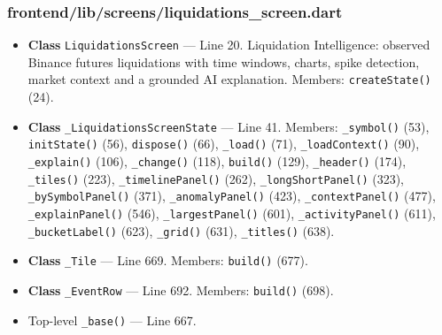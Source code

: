 \subsubsection*{frontend/lib/screens/liquidations\_screen.dart}
\begin{itemize}[nosep,leftmargin=1.5em]
\item \textbf{Class} \texttt{LiquidationsScreen} --- Line 20. Liquidation Intelligence: observed Binance futures liquidations with time windows, charts, spike detection, market context and a grounded AI explanation. Members: \texttt{createState(\allowbreak{})} (24).
\item \textbf{Class} \texttt{\_\allowbreak{}LiquidationsScreenState} --- Line 41. Members: \texttt{\_\allowbreak{}symbol(\allowbreak{})} (53), \texttt{initState(\allowbreak{})} (56), \texttt{dispose(\allowbreak{})} (66), \texttt{\_\allowbreak{}load(\allowbreak{})} (71), \texttt{\_\allowbreak{}loadContext(\allowbreak{})} (90), \texttt{\_\allowbreak{}explain(\allowbreak{})} (106), \texttt{\_\allowbreak{}change(\allowbreak{})} (118), \texttt{build(\allowbreak{})} (129), \texttt{\_\allowbreak{}header(\allowbreak{})} (174), \texttt{\_\allowbreak{}tiles(\allowbreak{})} (223), \texttt{\_\allowbreak{}timelinePanel(\allowbreak{})} (262), \texttt{\_\allowbreak{}longShortPanel(\allowbreak{})} (323), \texttt{\_\allowbreak{}bySymbolPanel(\allowbreak{})} (371), \texttt{\_\allowbreak{}anomalyPanel(\allowbreak{})} (423), \texttt{\_\allowbreak{}contextPanel(\allowbreak{})} (477), \texttt{\_\allowbreak{}explainPanel(\allowbreak{})} (546), \texttt{\_\allowbreak{}largestPanel(\allowbreak{})} (601), \texttt{\_\allowbreak{}activityPanel(\allowbreak{})} (611), \texttt{\_\allowbreak{}bucketLabel(\allowbreak{})} (623), \texttt{\_\allowbreak{}grid(\allowbreak{})} (631), \texttt{\_\allowbreak{}titles(\allowbreak{})} (638).
\item \textbf{Class} \texttt{\_\allowbreak{}Tile} --- Line 669. Members: \texttt{build(\allowbreak{})} (677).
\item \textbf{Class} \texttt{\_\allowbreak{}EventRow} --- Line 692. Members: \texttt{build(\allowbreak{})} (698).
\item Top-level \texttt{\_\allowbreak{}base(\allowbreak{})} --- Line 667.
\end{itemize}
